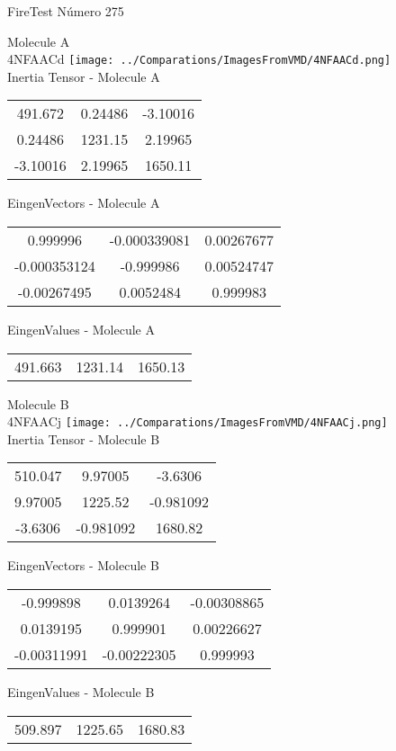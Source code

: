 \vtab[-2cm]
\begin{center}
{\large FireTest \tab Número 275}
\end{center}
\begin{multicols}{2}
\begin{center}

Molecule A \\ 
4NFAACd
\texttt{[image: ../Comparations/ImagesFromVMD/4NFAACd.png]}
\\
Inertia Tensor - Molecule A \\
\vtab

\begin{tabular}{|c c c|}
491.672	 & 	0.24486	 & 	-3.10016	 \\
0.24486	 & 	1231.15	 & 	2.19965	 \\
-3.10016	 & 	2.19965	 & 	1650.11
\end{tabular}

\vtab
 EingenVectors - Molecule A     \\
\vtab
\begin{tabular}{|c c c|}
0.999996	 & 	-0.000339081	 & 	0.00267677	 \\
-0.000353124	 & 	-0.999986	 & 	0.00524747	 \\
-0.00267495	 & 	0.0052484	 & 	0.999983
\end{tabular}

\vtab
 EingenValues - Molecule A     \\
\vtab
\begin{tabular}{|c c c|}
491.663	 & 	1231.14	 & 	1650.13	 \\
\end{tabular}
\columnbreak

Molecule B \\ 
4NFAACj
\texttt{[image: ../Comparations/ImagesFromVMD/4NFAACj.png]}
\\
Inertia Tensor - Molecule B \\
\vtab

\begin{tabular}{|c c c|}
510.047	 & 	9.97005	 & 	-3.6306	 \\
9.97005	 & 	1225.52	 & 	-0.981092	 \\
-3.6306	 & 	-0.981092	 & 	1680.82
\end{tabular}

\vtab
 EingenVectors - Molecule B     \\
\vtab
\begin{tabular}{|c c c|}
-0.999898	 & 	0.0139264	 & 	-0.00308865	 \\
0.0139195	 & 	0.999901	 & 	0.00226627	 \\
-0.00311991	 & 	-0.00222305	 & 	0.999993
\end{tabular}

\vtab
 EingenValues - Molecule B     \\
\vtab
\begin{tabular}{|c c c|}
509.897	 & 	1225.65	 & 	1680.83	 \\
\end{tabular}

\end{center}
\end{multicols}
